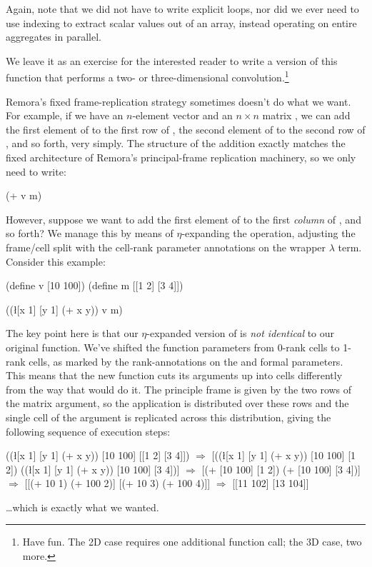 Again, note that we did not have to write explicit loops,
nor did we ever need to use indexing to extract scalar values out of an array,
instead operating on entire aggregates in parallel.

We leave it as an exercise for the interested reader to write
a version of this function that performs a two- or three-dimensional
convolution.\footnote{%
Have fun.
The 2D case requires one additional function call; the 3D case, two more.}


Remora's fixed frame-replication strategy sometimes doesn't do what we want.
For example,
if we have an $n$-element vector  and an $n \times n$ matrix ,
we can add the first element of  to the first row of ,
the second element of  to the second row of , and so forth,
very simply.
The structure of the addition exactly matches the fixed architecture
of Remora's principal-frame replication machinery,
so we only need to write:
\begin{code}
(+ v m) \end{code}

However, suppose we want to add the first element of  to the
first \emph{column} of , and so forth?
We manage this by means of $\eta$-expanding the \ex{+} operation,
adjusting the frame/cell split with the cell-rank parameter annotations
on the wrapper $\lambda$ term.
Consider this example:
\begin{code}
(define v [10 100])
(define m [[1 2]
           [3 4]])

((\l{[x 1] [y 1]} (+ x y))
 v
 m)\end{code}
The key point here is that our $\eta$-expanded version of \ex{+} is
\emph{not identical} to our original \ex{+} function.
We've shifted the function parameters from 0-rank cells to 1-rank cells,
as marked by the  rank-annotations on the  and 
formal parameters.
This means that the new function cuts its arguments up into cells
differently from the way that \ex{+} would do it.
The principle frame is given by the two rows of the matrix argument,
so the application is distributed over these rows
and the single cell of the  argument is replicated across
this distribution, giving the following sequence of execution steps:
\begin{code}
((\l{[x 1] [y 1]} (+ x y)) [10 100] [[1 2]
                                     [3 4]])
\(\Rightarrow\)
[((\l{[x 1] [y 1]} (+ x y)) [10 100] [1 2])
 ((\l{[x 1] [y 1]} (+ x y)) [10 100] [3 4])]
\(\Rightarrow\)
[(+ [10 100] [1 2])
 (+ [10 100] [3 4])]
\(\Rightarrow\)
[[(+ 10 1) (+ 100 2)]
 [(+ 10 3) (+ 100 4)]]
\(\Rightarrow\)
[[11 102]
 [13 104]]\end{code}
%
\ldots which is exactly what we wanted.

